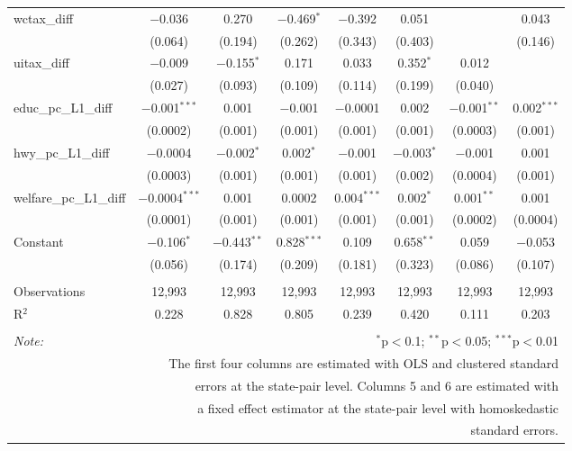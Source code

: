 \begin{table}[!htbp]
\begin{tabular}{@{\extracolsep{5pt}}lccccccc}
  wctax\_diff & $-$0.036 & 0.270 & $-$0.469$^{*}$ & $-$0.392 & 0.051 &  & 0.043 \\ 
  & (0.064) & (0.194) & (0.262) & (0.343) & (0.403) &  & (0.146) \\ 
  uitax\_diff & $-$0.009 & $-$0.155$^{*}$ & 0.171 & 0.033 & 0.352$^{*}$ & 0.012 &  \\ 
  & (0.027) & (0.093) & (0.109) & (0.114) & (0.199) & (0.040) &  \\ 
  educ\_pc\_L1\_diff & $-$0.001$^{***}$ & 0.001 & $-$0.001 & $-$0.0001 & 0.002 & $-$0.001$^{**}$ & 0.002$^{***}$ \\ 
  & (0.0002) & (0.001) & (0.001) & (0.001) & (0.001) & (0.0003) & (0.001) \\ 
  hwy\_pc\_L1\_diff & $-$0.0004 & $-$0.002$^{*}$ & 0.002$^{*}$ & $-$0.001 & $-$0.003$^{*}$ & $-$0.001 & 0.001 \\ 
  & (0.0003) & (0.001) & (0.001) & (0.001) & (0.002) & (0.0004) & (0.001) \\ 
  welfare\_pc\_L1\_diff & $-$0.0004$^{***}$ & 0.001 & 0.0002 & 0.004$^{***}$ & 0.002$^{*}$ & 0.001$^{**}$ & 0.001 \\ 
  & (0.0001) & (0.001) & (0.001) & (0.001) & (0.001) & (0.0002) & (0.0004) \\ 
  Constant & $-$0.106$^{*}$ & $-$0.443$^{**}$ & 0.828$^{***}$ & 0.109 & 0.658$^{**}$ & 0.059 & $-$0.053 \\ 
  & (0.056) & (0.174) & (0.209) & (0.181) & (0.323) & (0.086) & (0.107) \\ 
 \hline \\[-1.8ex] 
Observations & 12,993 & 12,993 & 12,993 & 12,993 & 12,993 & 12,993 & 12,993 \\ 
R$^{2}$ & 0.228 & 0.828 & 0.805 & 0.239 & 0.420 & 0.111 & 0.203 \\ 
\hline 
\hline \\[-1.8ex] 
\textit{Note:}  & \multicolumn{7}{r}{$^{*}$p$<$0.1; $^{**}$p$<$0.05; $^{***}$p$<$0.01} \\ 
 & \multicolumn{7}{r}{The first four columns are estimated with OLS and clustered standard} \\ 
 & \multicolumn{7}{r}{ errors at the state-pair level. Columns 5 and 6 are estimated with} \\ 
 & \multicolumn{7}{r}{a fixed effect estimator at the state-pair level with homoskedastic} \\ 
 & \multicolumn{7}{r}{standard errors.} \\ 
\end{tabular} 
\end{table} 
